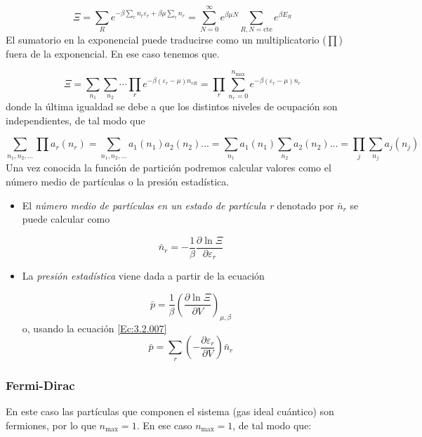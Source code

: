 \documentclass[12pt,a4paper]{article}
\numberwithin{equation}{section}
\numberwithin{figure}{section}
\newcommand{\parentesis}[1]{\left( #1  \right)}
\newcommand{\parciales}[2]{\frac{\partial #1}{\partial #2}}
\newcommand{\pparciales}[2]{\parentesis{\parciales{#1}{#2}}}
\newcommand{\cte}{\mathrm{cte}}
\theoremstyle{definition}
\begin{document}
\begin{equation}
\Xi = \sum_R e^{-\beta \sum_r n_r \varepsilon_r + \beta \mu \sum_r n_r} = \sum_{N=0}^{\infty} e^{\beta \mu N} \sum_{R, N=\cte} e^{\beta E_R}
\end{equation}
El sumatorio en la exponencial puede traducirse como un multiplicatorio ($\prod$) fuera de la exponencial. En ese caso tenemos que.

\begin{equation}
\Xi = \sum_{n_1} \sum_{n_2} \cdots \prod_r e^{-\beta(\varepsilon_r - \mu)n_{rR}} = \prod_r \sum_{n_r=0}^{n_{\max}} e^{-\beta (\varepsilon_r - \mu) n_r} \label{Ec:3.2.007}
\end{equation} 
donde la última igualdad se debe a que los distintos niveles de ocupación son independientes, de tal modo que

$$ \sum_{n_1,n_2,...} \prod a_r(n_r) =\sum_{n_1,n_2,...}  a_1(n_1) a_2(n_2)... = \sum_{n_1} a_1(n_1) \sum_{n_2} a_2 (n_2) ... =
\prod_j \sum_{n_j} a_j (n_j) $$
Una vez conocida la función de partición podremos calcular valores como  el número medio de partículas o la presión estadística.

\begin{itemize}
\item El \textit{número medio de partículas en un estado de partícula r} denotado por $\bar{n}_r$ se puede calcular como

\begin{equation}
\bar{n}_r = - \frac{1}{\beta} \parciales{\ln\Xi}{\varepsilon_r}
\end{equation}
\item La \textit{presión estadística} viene dada a partir de la ecuación

\begin{equation}
\bar{p} = \frac{1}{\beta} \pparciales{\ln \Xi}{V}_{\mu,\beta}
\end{equation}
o, usando la ecuación \ref{Ec:3.2.007}
\begin{equation}
\bar{p} = \sum_r \parentesis{-\parciales{\varepsilon_r}{V}} \bar{n}_r
\end{equation}
\end{itemize}

\subsubsection{Fermi-Dirac}

En este caso las partículas que componen el sistema (gas ideal cuántico) son fermiones, por lo que $n_{\max}=1$. En ese caso $n_{\max}=1$, de tal modo que:
\end{document}
